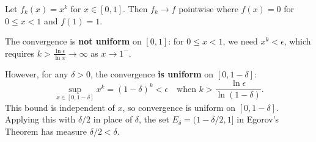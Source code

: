 \documentclass[11pt]{report}
\begin{document}
\begin{exbox}
Let $f_k(x) = x^k$ for $x \in [0, 1]$. Then $f_k \to f$ pointwise where $f(x) = 0$ for $0 \leq x < 1$ and $f(1) = 1$.

The convergence is \textbf{not uniform} on $[0, 1]$: for $0 \leq x < 1$, we need $x^k < \epsilon$, which requires $k > \frac{\ln \epsilon}{\ln x} \to \infty$ as $x \to 1^-$.

However, for any $\delta > 0$, the convergence \textbf{is uniform} on $[0, 1 - \delta]$:
\[
\sup_{x \in [0, 1-\delta]} x^k = (1 - \delta)^k < \epsilon \quad \text{when } k > \frac{\ln \epsilon}{\ln(1 - \delta)}.
\]
This bound is independent of $x$, so convergence is uniform on $[0, 1 - \delta]$. Applying this with $\delta/2$ in place of $\delta$, the set $E_\delta = (1 - \delta/2, 1]$ in Egorov's Theorem has measure $\delta/2 < \delta$.
\end{exbox}
\end{document}
